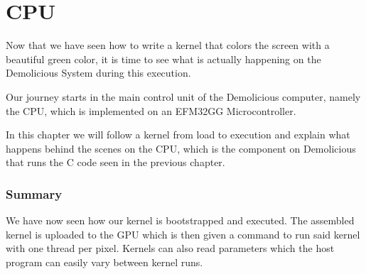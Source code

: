 \documentclass[../main/report.tex]{subfiles}
\begin{document}
\chapter{CPU}

Now that we have seen how to write a kernel that colors the screen with a beautiful green color, 
it is time to see what is actually happening on the Demolicious System during this execution. 

Our journey starts in the main control unit of the Demolicious computer, namely the CPU, which is implemented on an EFM32GG Microcontroller.

In this chapter we will follow a kernel from load to execution and explain what happens behind the scenes on the CPU, which is the component on Demolicious that runs the C code seen in the previous chapter.











\subsection{Summary}

We have now seen how our kernel is bootstrapped and executed.
The assembled kernel is uploaded to the GPU which is then given a command to run said kernel with one thread per pixel.
Kernels can also read parameters which the host program can easily vary between kernel runs.
\end{document}
